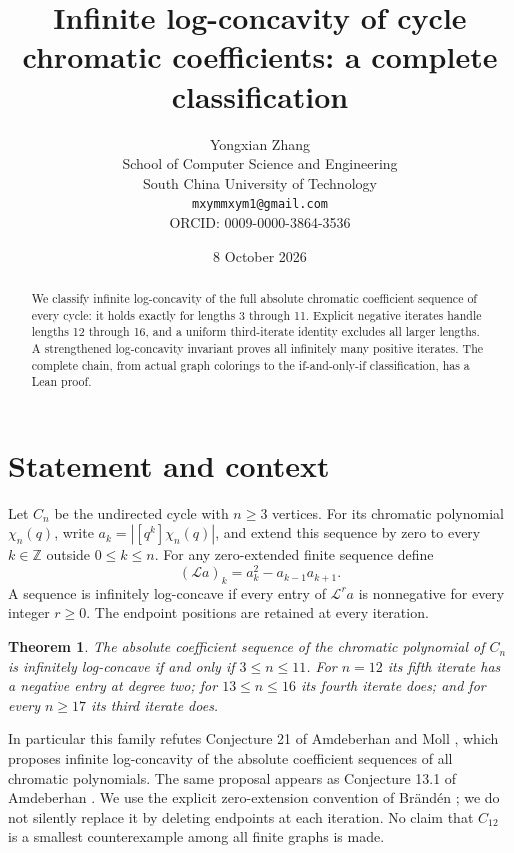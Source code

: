 \documentclass[11pt]{article}
\title{Infinite log-concavity of cycle chromatic coefficients: a complete classification}
\author{Yongxian Zhang\\[2pt]\small School of Computer Science and Engineering\\\small South China University of Technology\\\small\texttt{mxymmxym1@gmail.com}\\\small ORCID: 0009-0000-3864-3536}
\date{8 October 2026}
\newtheorem{theorem}{Theorem}
\begin{document}
\maketitle
\begin{abstract}We classify infinite log-concavity of the full absolute chromatic coefficient sequence of every cycle: it holds exactly for lengths 3 through 11. Explicit negative iterates handle lengths 12 through 16, and a uniform third-iterate identity excludes all larger lengths. A strengthened log-concavity invariant proves all infinitely many positive iterates. The complete chain, from actual graph colorings to the if-and-only-if classification, has a Lean proof.\end{abstract}
\section{Statement and context}
Let $C_n$ be the undirected cycle with $n\ge3$ vertices. For its chromatic
polynomial $\chi_n(q)$, write $a_k=|[q^k]\chi_n(q)|$, and extend this
sequence by zero to every $k\in\mathbb Z$ outside $0\le k\le n$.
For any zero-extended finite sequence define
\[
 (\mathcal La)_k=a_k^2-a_{k-1}a_{k+1}.
\]
A sequence is infinitely log-concave if every entry of $\mathcal L^r a$
is nonnegative for every integer $r\ge0$. The endpoint positions are
retained at every iteration.

\begin{theorem}\label{thm:classification}
The absolute coefficient sequence of the chromatic polynomial of $C_n$
is infinitely log-concave if and only if $3\le n\le11$.
For $n=12$ its fifth iterate has a negative entry at degree two;
for $13\le n\le16$ its fourth iterate does; and for every $n\ge17$
its third iterate does.
\end{theorem}

In particular this family refutes Conjecture 21 of Amdeberhan and Moll
\cite{AM}, which proposes infinite log-concavity of the absolute coefficient
sequences of all chromatic polynomials. The same proposal appears as
Conjecture 13.1 of Amdeberhan \cite{A}. We use the explicit zero-extension
convention of Br\"and\'en \cite{B}; we do not silently replace it by
deleting endpoints at each iteration. No claim that $C_{12}$ is a smallest
counterexample among all finite graphs is made.
\end{document}
